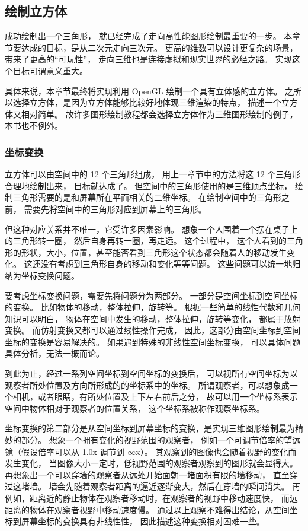 \documentclass[fontset=windows]{ctexart}
\begin{document}
\subsection{绘制立方体}

成功绘制出一个三角形，
就已经完成了走向高性能图形绘制最重要的一步。
本章节要达成的目标，是从二次元走向三次元。
更高的维数可以设计更复杂的场景，
带来了更高的“可玩性”，
走向三维也是连接虚拟和现实世界的必经之路。
实现这个目标可谓意义重大。

具体来说，本章节最终将实现利用 OpenGL 绘制一个具有立体感的立方体。
之所以选择立方体，是因为立方体能够比较好地体现三维渲染的特点，
描述一个立方体又相对简单。
故许多图形绘制教程都会选择立方体作为三维图形绘制的例子，
本书也不例外。

\subsubsection{坐标变换}

\label{sec-gl:coordinate-transform}

立方体可以由空间中的 12 个三角形组成，
用上一章节中的方法将这 12 个三角形合理地绘制出来，
目标就达成了。
但空间中的三角形使用的是三维顶点坐标，
绘制三角形需要的是和屏幕所在平面相关的二维坐标。
在绘制空间中的三角形之前，
需要先将空间中的三角形对应到屏幕上的三角形。

但这种对应关系并不唯一，它受许多因素影响。
想象一个人围着一个摆在桌子上的三角形转一圈，
然后自身再转一圈，再走远。
这个过程中，
这个人看到的三角形的形状，大小，位置，甚至能否看到三角形这个状态都会随着人的移动发生变化。
这还没有考虑到三角形自身的移动和变化等等问题。
这些问题可以统一地归纳为坐标变换问题。

要考虑坐标变换问题，需要先将问题分为两部分。
一部分是空间坐标到空间坐标的变换。
比如物体的移动，整体拉伸，旋转等。
根据一些简单的线性代数和几何知识可以明白，
物体在空间中发生的移动，整体拉伸，旋转等变化，
都属于放射变换。
而仿射变换又都可以通过线性操作完成，
因此，这部分由空间坐标到空间坐标的变换是容易解决的。
如果遇到特殊的非线性空间坐标变换，
可以具体问题具体分析，无法一概而论。

到此为止，经过一系列空间坐标到空间坐标的变换后，
可以视所有空间坐标为以观察者所处位置及方向所形成的的坐标系中的坐标。
所谓观察者，可以想象成一个相机，或者眼睛，有所处位置及上下左右前后之分，
故可以用一个坐标系表示空间中物体相对于观察者的位置关系，
这个坐标系被称作观察坐标系。

坐标变换的第二部分是从空间坐标到屏幕坐标的变换，是实现三维图形绘制最为精妙的部分。
想象一个拥有变化的视野范围的观察者，
例如一个可调节倍率的望远镜（假设倍率可以从 1.0x 调节到 $\infty$x）。
其观察到的图像也会随着视野的变化而发生变化，
当图像大小一定时，低视野范围的观察者观察到的图形就会显得大。
再想象出一个可以穿墙的观察者从远处开始面朝一堵面积有限的墙移动，
直至穿过这堵墙。
墙会先随着观察者距离的逼近逐渐变大，然后在穿墙的瞬间消失。
再例如，距离近的静止物体在观察者移动时，在观察者的视野中移动速度快，
而远距离的物体在观察者视野中移动速度慢。
通过以上观察不难得出结论，从空间坐标到屏幕坐标的变换具有非线性性，
因此描述这种变换相对困难一些。
\end{document}
